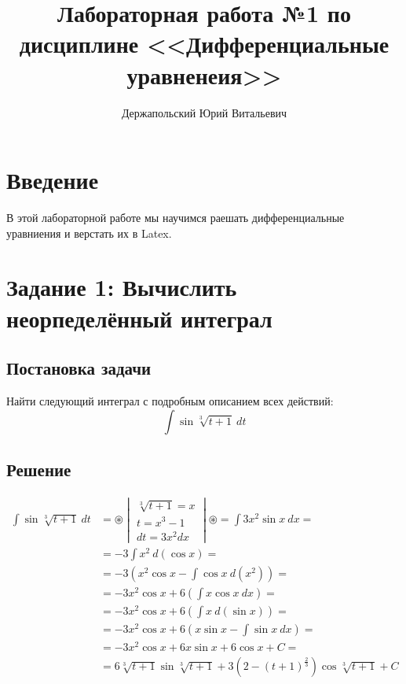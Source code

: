 \documentclass[14pt, a4paper, titlepage, fleqn]{extarticle}
\title{Лабораторная работа №1 по дисциплине <<Дифференциальные уравненеия>>}
\author{Держапольский Юрий Витальевич}
\begin{document}
    \maketitle

    \tableofcontents

    \pagebreak

    \section{Введение}
        В этой лабораторной работе мы научимся раешать дифференциальные
        уравниения и верстать их в Latex.

    \pagebreak

    \section{Задание 1: Вычислить неорпеделённый интеграл}
        \subsection{Постановка задачи}
            Найти следующий интеграл с подробным описанием всех действий:
            \[ \int \sin{ \sqrt[3]{t+1} } ~ dt \]
        
        \subsection{Решение}
        \[
            \begin{split}
                \int \sin{ \sqrt[3]{t+1} } ~ dt &= \circledast
                \begin{vmatrix}
                    \sqrt[3]{t+1} = x \\
                    t = x^3 - 1 \\
                    dt = 3x^2dx 
                \end{vmatrix}
                \circledast = \int 3x^2\sin{x} ~ dx = \\
                &= -3 \int x^2 ~ d(\cos{x}) = \\
                &= -3 \left( 
                    x^2\cos{x} - \int \cos{x} ~ d \left(x^2\right) 
                \right) = \\
                &= -3x^2\cos{x} + 6\left(\int x \cos{x} ~ dx\right) = \\
                &= -3x^2\cos{x} + 6\left(\int x ~ d(\sin{x})\right) = \\
                &= -3x^2\cos{x} + 6\left(x\sin{x} - \int \sin{x} ~ dx \right)=\\
                &= -3x^2\cos{x} + 6x\sin{x} + 6\cos{x} + C =\\
                &= 6 \sqrt[3]{t+1} \sin{\sqrt[3]{t+1}} + 
                    3\left(2 - (t+1)^{\frac{2}{3}}\right) \cos{\sqrt[3]{t+1}}+C
            \end{split}    
        \]
\end{document}
